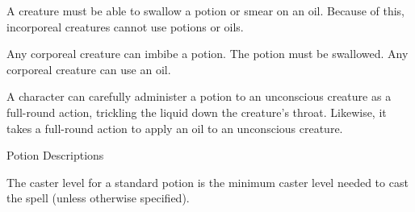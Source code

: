 \documentclass{article}
\begin{document}
A creature must be able to swallow a potion or smear on an oil. Because of this, 
incorporeal creatures cannot use potions or oils. 

Any corporeal creature can imbibe a potion. The potion must be swallowed. Any corporeal 
creature can use an oil.

A character can carefully administer a potion to an unconscious creature as a full-round 
action, trickling the liquid down the creature's throat. Likewise, it takes a full-round 
action to apply an oil to an unconscious creature.

\vspace{12pt}
Potion Descriptions

The caster level for a standard potion is the minimum caster level needed to cast 
the spell (unless otherwise specified).
\end{document}
